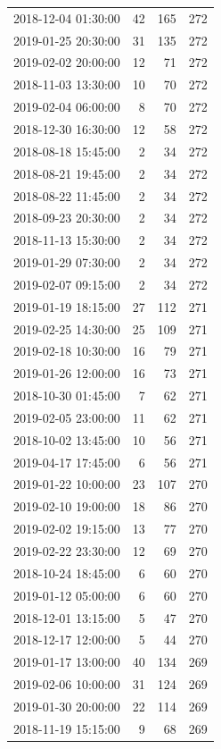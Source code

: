 \begin{tabular}{lrrr}
2018-12-04 01:30:00 & 42 & 165 & 272 \\
2019-01-25 20:30:00 & 31 & 135 & 272 \\
2019-02-02 20:00:00 & 12 & 71 & 272 \\
2018-11-03 13:30:00 & 10 & 70 & 272 \\
2019-02-04 06:00:00 & 8 & 70 & 272 \\
2018-12-30 16:30:00 & 12 & 58 & 272 \\
2018-08-18 15:45:00 & 2 & 34 & 272 \\
2018-08-21 19:45:00 & 2 & 34 & 272 \\
2018-08-22 11:45:00 & 2 & 34 & 272 \\
2018-09-23 20:30:00 & 2 & 34 & 272 \\
2018-11-13 15:30:00 & 2 & 34 & 272 \\
2019-01-29 07:30:00 & 2 & 34 & 272 \\
2019-02-07 09:15:00 & 2 & 34 & 272 \\
2019-01-19 18:15:00 & 27 & 112 & 271 \\
2019-02-25 14:30:00 & 25 & 109 & 271 \\
2019-02-18 10:30:00 & 16 & 79 & 271 \\
2019-01-26 12:00:00 & 16 & 73 & 271 \\
2018-10-30 01:45:00 & 7 & 62 & 271 \\
2019-02-05 23:00:00 & 11 & 62 & 271 \\
2018-10-02 13:45:00 & 10 & 56 & 271 \\
2019-04-17 17:45:00 & 6 & 56 & 271 \\
2019-01-22 10:00:00 & 23 & 107 & 270 \\
2019-02-10 19:00:00 & 18 & 86 & 270 \\
2019-02-02 19:15:00 & 13 & 77 & 270 \\
2019-02-22 23:30:00 & 12 & 69 & 270 \\
2018-10-24 18:45:00 & 6 & 60 & 270 \\
2019-01-12 05:00:00 & 6 & 60 & 270 \\
2018-12-01 13:15:00 & 5 & 47 & 270 \\
2018-12-17 12:00:00 & 5 & 44 & 270 \\
2019-01-17 13:00:00 & 40 & 134 & 269 \\
2019-02-06 10:00:00 & 31 & 124 & 269 \\
2019-01-30 20:00:00 & 22 & 114 & 269 \\
2018-11-19 15:15:00 & 9 & 68 & 269 \\

\end{tabular}

